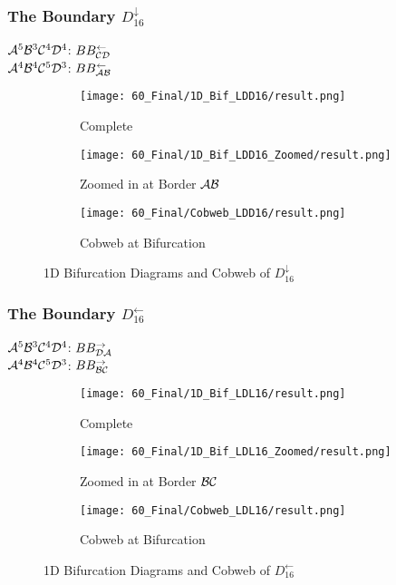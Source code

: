\subsubsection{The Boundary $D_{16}^\downarrow$}

$\mathcal{A}^5\mathcal{B}^3\mathcal{C}^4\mathcal{D}^4$: $BB_{\mathcal{C}\mathcal{D}}^\leftarrow$ \\
$\mathcal{A}^4\mathcal{B}^4\mathcal{C}^5\mathcal{D}^3$: $BB_{\mathcal{A}\mathcal{B}}^\leftarrow$

\begin{figure}
    \centering
    \begin{subfigure}{0.3\textwidth}
        \centering
        \texttt{[image: 60\_Final/1D\_Bif\_LDD16/result.png]}
        \caption{Complete}
        \label{fig:final.bifurcation.D.down}
    \end{subfigure}
    \begin{subfigure}{0.3\textwidth}
        \centering
        \texttt{[image: 60\_Final/1D\_Bif\_LDD16\_Zoomed/result.png]}
        \caption{Zoomed in at Border $\mathcal{A}\mathcal{B}$}
        \label{fig:final.bifurcation.D.down.zoomed}
    \end{subfigure}
    \begin{subfigure}{0.3\textwidth}
        \centering
        \texttt{[image: 60\_Final/Cobweb\_LDD16/result.png]}
        \caption{Cobweb at Bifurcation}
        \label{fig:final.bifurcation.D.down.cobweb}
    \end{subfigure}
    \caption{1D Bifurcation Diagrams and Cobweb of $D_{16}^\downarrow$}
\end{figure}

\subsubsection{The Boundary $D_{16}^\leftarrow$}

$\mathcal{A}^5\mathcal{B}^3\mathcal{C}^4\mathcal{D}^4$: $BB_{\mathcal{D}\mathcal{A}}^\rightarrow$ \\
$\mathcal{A}^4\mathcal{B}^4\mathcal{C}^5\mathcal{D}^3$: $BB_{\mathcal{B}\mathcal{C}}^\rightarrow$

\begin{figure}
    \centering
    \begin{subfigure}{0.3\textwidth}
        \centering
        \texttt{[image: 60\_Final/1D\_Bif\_LDL16/result.png]}
        \caption{Complete}
        \label{fig:final.bifurcation.D.left}
    \end{subfigure}
    \begin{subfigure}{0.3\textwidth}
        \centering
        \texttt{[image: 60\_Final/1D\_Bif\_LDL16\_Zoomed/result.png]}
        \caption{Zoomed in at Border $\mathcal{B}\mathcal{C}$}
        \label{fig:final.bifurcation.D.left.zoomed}
    \end{subfigure}
    \begin{subfigure}{0.3\textwidth}
        \centering
        \texttt{[image: 60\_Final/Cobweb\_LDL16/result.png]}
        \caption{Cobweb at Bifurcation}
        \label{fig:final.bifurcation.D.left.cobweb}
    \end{subfigure}
    \caption{1D Bifurcation Diagrams and Cobweb of $D_{16}^\leftarrow$}
\end{figure}
